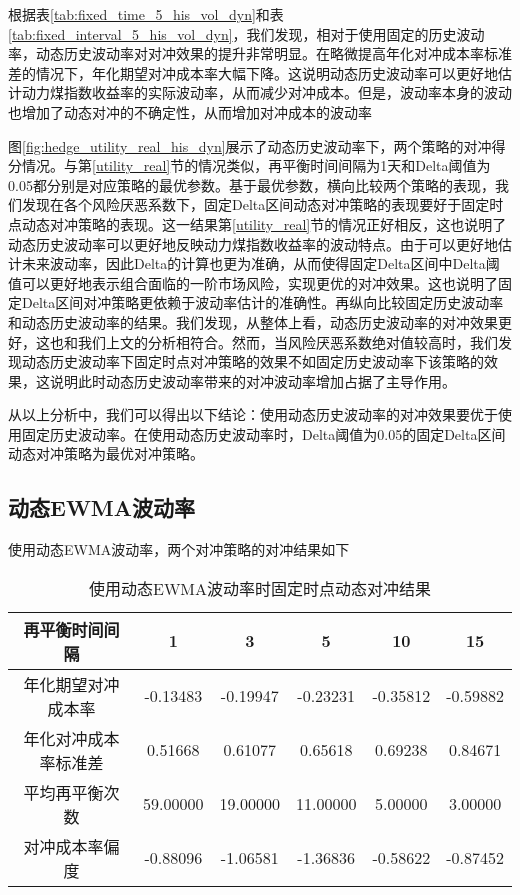 根据表\ref{tab:fixed_time_5_his_vol_dyn}和表\ref{tab:fixed_interval_5_his_vol_dyn}，我们发现，相对于使用固定的历史波动率，动态历史波动率对对冲效果的提升非常明显。在略微提高年化对冲成本率标准差的情况下，年化期望对冲成本率大幅下降。这说明动态历史波动率可以更好地估计动力煤指数收益率的实际波动率，从而减少对冲成本。但是，波动率本身的波动也增加了动态对冲的不确定性，从而增加对冲成本的波动率

图\ref{fig:hedge_utility_real_his_dyn}展示了动态历史波动率下，两个策略的对冲得分情况。与第\ref{utility_real}节的情况类似，再平衡时间间隔为1天和Delta阈值为0.05都分别是对应策略的最优参数。基于最优参数，横向比较两个策略的表现，我们发现在各个风险厌恶系数下，固定Delta区间动态对冲策略的表现要好于固定时点动态对冲策略的表现。这一结果第\ref{utility_real}节的情况正好相反，这也说明了动态历史波动率可以更好地反映动力煤指数收益率的波动特点。由于可以更好地估计未来波动率，因此Delta的计算也更为准确，从而使得固定Delta区间中Delta阈值可以更好地表示组合面临的一阶市场风险，实现更优的对冲效果。这也说明了固定Delta区间对冲策略更依赖于波动率估计的准确性。再纵向比较固定历史波动率和动态历史波动率的结果。我们发现，从整体上看，动态历史波动率的对冲效果更好，这也和我们上文的分析相符合。然而，当风险厌恶系数绝对值较高时，我们发现动态历史波动率下固定时点对冲策略的效果不如固定历史波动率下该策略的效果，这说明此时动态历史波动率带来的对冲波动率增加占据了主导作用。

从以上分析中，我们可以得出以下结论：使用动态历史波动率的对冲效果要优于使用固定历史波动率。在使用动态历史波动率时，Delta阈值为0.05的固定Delta区间动态对冲策略为最优对冲策略。

\subsection{动态EWMA波动率}

使用动态EWMA波动率，两个对冲策略的对冲结果如下

\begin{table}[htbp]
  \centering
  \caption{使用动态EWMA波动率时固定时点动态对冲结果}
  \label{tab:fixed_time_5_ewma_vol_dyn}
  \begin{tabular}{cccccc}
    \toprule
    再平衡时间间隔 & 1 & 3 & 5 & 10 & 15 \\
    \midrule
    年化期望对冲成本率 & -0.13483 & -0.19947 & -0.23231 & -0.35812 & -0.59882 \\
    年化对冲成本率标准差 & 0.51668 & 0.61077 & 0.65618 & 0.69238 & 0.84671 \\
    平均再平衡次数 & 59.00000 & 19.00000 & 11.00000 & 5.00000 & 3.00000 \\
    对冲成本率偏度 & -0.88096 & -1.06581 & -1.36836 & -0.58622 & -0.87452 \\
    \bottomrule
  \end{tabular}
\end{table}

